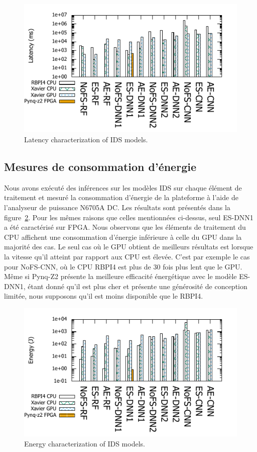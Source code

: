 \begin{figure}
    \centering
    \includegraphics[width=0.9\columnwidth]{5_Chapitre5/figures/latency_bar.pdf}
    \caption{Latency characterization of IDS models.}
    \label{figure:herocache-performance}
\end{figure}

\subsection{Mesures de consommation d'énergie}

Nous avons exécuté des inférences sur les modèles IDS sur chaque élément de traitement et mesuré la consommation d'énergie de la plateforme à l'aide de l'analyseur de puissance N6705A DC. Les résultats sont présentés dans la figure~\ref{figure:herocache-energy}. Pour les mêmes raisons que celles mentionnées ci-dessus, seul ES-DNN1 a été caractérisé sur FPGA. Nous observons que les éléments de traitement du CPU affichent une consommation d'énergie inférieure à celle du GPU dans la majorité des cas. Le seul cas où le GPU obtient de meilleurs résultats est lorsque la vitesse qu'il atteint par rapport aux CPU est élevée. C'est par exemple le cas pour NoFS-CNN, où le CPU RBPI4 est plus de 30 fois plus lent que le GPU. Même si Pynq-Z2 présente la meilleure efficacité énergétique avec le modèle ES-DNN1, étant donné qu'il est plus cher et présente une générosité de conception limitée, nous supposons qu'il est moins disponible que le RBPI4.

\begin{figure}
    \centering
    \includegraphics[width=0.9\columnwidth]{5_Chapitre5/figures/energy_bar.pdf}
    \caption{Energy characterization of IDS models.}
    \label{figure:herocache-energy}
\end{figure}

